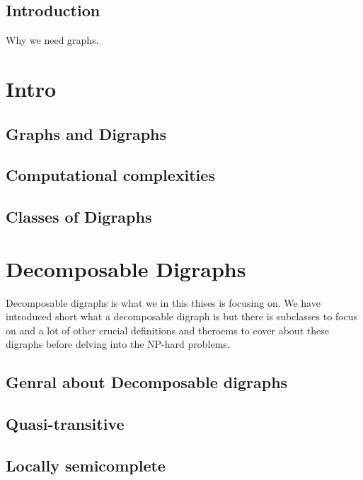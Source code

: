 \section{Introduction}
Why we need graphs.
\chapter{Intro}
\label{chap:intro}
\section{Graphs and Digraphs}
\label{sec:digraph}

\section{Computational complexities}
\label{sec:complexity}
%
\section{Classes of Digraphs}
\label{sec:class}


\chapter{Decomposable Digraphs}
\label{chap:decomposable}
Decomposable digraphs is what we in this thises is focusing on. 
We have introduced short what a decomposable digraph is but there is subclasses to focus on and a lot of other crucial definitions and theroems to cover about these digraphs before delving into the NP-hard problems.
\section{Genral about Decomposable digraphs}
\label{sec:gdecomposable}

\section{Quasi-transitive}
\label{sec:quasi}

\section{Locally semicomplete}
\label{sec:locally}
